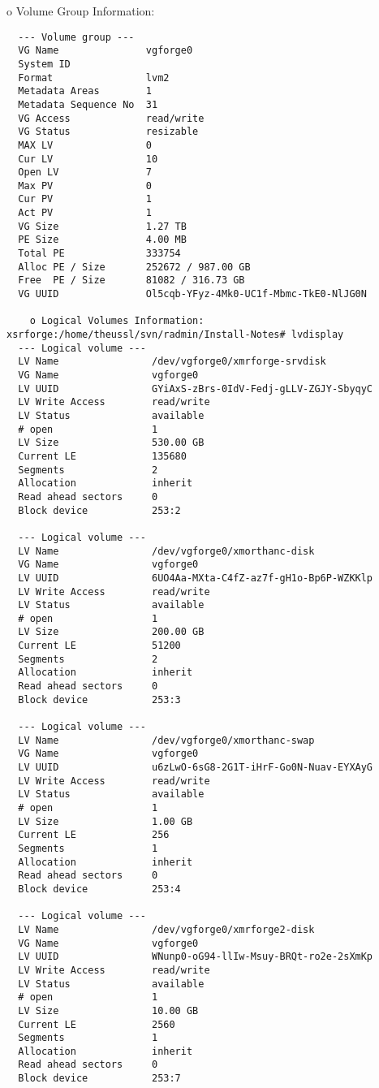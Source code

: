 \documentclass[a4paper]{article}
\begin{document}
	o Volume Group Information:
\begin{lstlisting}
  --- Volume group ---
  VG Name               vgforge0
  System ID             
  Format                lvm2
  Metadata Areas        1
  Metadata Sequence No  31
  VG Access             read/write
  VG Status             resizable
  MAX LV                0
  Cur LV                10
  Open LV               7
  Max PV                0
  Cur PV                1
  Act PV                1
  VG Size               1.27 TB
  PE Size               4.00 MB
  Total PE              333754
  Alloc PE / Size       252672 / 987.00 GB
  Free  PE / Size       81082 / 316.73 GB
  VG UUID               Ol5cqb-YFyz-4Mk0-UC1f-Mbmc-TkE0-NlJG0N

	o Logical Volumes Information:
xsrforge:/home/theussl/svn/radmin/Install-Notes# lvdisplay
  --- Logical volume ---
  LV Name                /dev/vgforge0/xmrforge-srvdisk
  VG Name                vgforge0
  LV UUID                GYiAxS-zBrs-0IdV-Fedj-gLLV-ZGJY-SbyqyC
  LV Write Access        read/write
  LV Status              available
  # open                 1
  LV Size                530.00 GB
  Current LE             135680
  Segments               2
  Allocation             inherit
  Read ahead sectors     0
  Block device           253:2
   
  --- Logical volume ---
  LV Name                /dev/vgforge0/xmorthanc-disk
  VG Name                vgforge0
  LV UUID                6UO4Aa-MXta-C4fZ-az7f-gH1o-Bp6P-WZKKlp
  LV Write Access        read/write
  LV Status              available
  # open                 1
  LV Size                200.00 GB
  Current LE             51200
  Segments               2
  Allocation             inherit
  Read ahead sectors     0
  Block device           253:3
   
  --- Logical volume ---
  LV Name                /dev/vgforge0/xmorthanc-swap
  VG Name                vgforge0
  LV UUID                u6zLwO-6sG8-2G1T-iHrF-Go0N-Nuav-EYXAyG
  LV Write Access        read/write
  LV Status              available
  # open                 1
  LV Size                1.00 GB
  Current LE             256
  Segments               1
  Allocation             inherit
  Read ahead sectors     0
  Block device           253:4
   
  --- Logical volume ---
  LV Name                /dev/vgforge0/xmrforge2-disk
  VG Name                vgforge0
  LV UUID                WNunp0-oG94-llIw-Msuy-BRQt-ro2e-2sXmKp
  LV Write Access        read/write
  LV Status              available
  # open                 1
  LV Size                10.00 GB
  Current LE             2560
  Segments               1
  Allocation             inherit
  Read ahead sectors     0
  Block device           253:7
   

\end{lstlisting}
\end{document}

